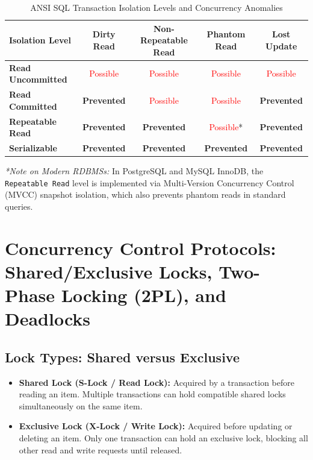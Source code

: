 \begin{table}[htbp]
\centering
\caption{ANSI SQL Transaction Isolation Levels and Concurrency Anomalies}
\label{tab:isolation_levels_matrix}
\begin{tabularx}{\textwidth}{l c c c c}
\toprule
\textbf{Isolation Level} & \textbf{Dirty Read} & \textbf{Non-Repeatable Read} & \textbf{Phantom Read} & \textbf{Lost Update} \\
\midrule
\textbf{Read Uncommitted} & \textcolor{red}{Possible} & \textcolor{red}{Possible} & \textcolor{red}{Possible} & \textcolor{red}{Possible} \\
\textbf{Read Committed} & \textbf{Prevented} & \textcolor{red}{Possible} & \textcolor{red}{Possible} & \textbf{Prevented} \\
\textbf{Repeatable Read} & \textbf{Prevented} & \textbf{Prevented} & \textcolor{red}{Possible}* & \textbf{Prevented} \\
\textbf{Serializable} & \textbf{Prevented} & \textbf{Prevented} & \textbf{Prevented} & \textbf{Prevented} \\
\bottomrule
\end{tabularx}
\end{table}

\textit{*Note on Modern RDBMSs:} In PostgreSQL and MySQL InnoDB, the \texttt{Repeatable Read} level is implemented via Multi-Version Concurrency Control (MVCC) snapshot isolation, which also prevents phantom reads in standard queries.

\newpage
\section{Concurrency Control Protocols: Shared/Exclusive Locks, Two-Phase Locking (2PL), and Deadlocks}

\subsection{Lock Types: Shared versus Exclusive}

\begin{itemize}
\item \textbf{Shared Lock (S-Lock / Read Lock):} Acquired by a transaction before reading an item. Multiple transactions can hold compatible shared locks simultaneously on the same item.
\item \textbf{Exclusive Lock (X-Lock / Write Lock):} Acquired before updating or deleting an item. Only one transaction can hold an exclusive lock, blocking all other read and write requests until released.
\end{itemize}


